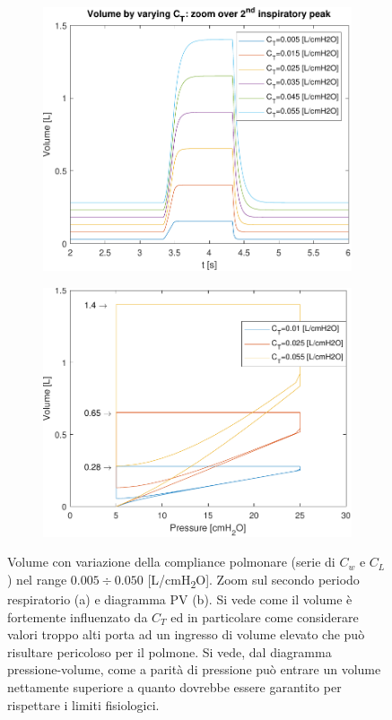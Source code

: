 \begin{figure}[t!]
	\begin{subfigure}{0.5\linewidth}
	\centering
	\includegraphics[width=0.95\linewidth]{../model/data_log/CwCL_volume_zoom.pdf}
	\caption{}
\end{subfigure}\hfill
	\begin{subfigure}{0.5\linewidth}
	\centering
	\includegraphics[width=0.95\linewidth]{../model/data_log/CwCL_PV.pdf}
	\caption{}
\end{subfigure}\hfill
	\caption{Volume con variazione della compliance polmonare (serie di $C_w$ e $C_L$) nel range $0.005\div 0.050$ [L/cmH\textsubscript{2}O]. Zoom sul secondo periodo respiratorio (a) e diagramma PV (b). Si vede come il volume è fortemente influenzato da $C_T$ ed in particolare come considerare valori troppo alti porta ad un ingresso di volume elevato che può risultare pericoloso per il polmone. Si vede, dal diagramma pressione-volume, come a parità di pressione può entrare un volume nettamente superiore a quanto dovrebbe essere garantito per rispettare i limiti fisiologici. }
\end{figure}

